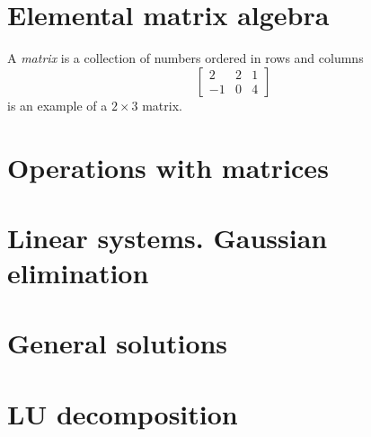 
\section{Elemental matrix algebra}
\begin{defn}[Matrix]
    A \textit{matrix} is a collection of numbers ordered in rows and columns
    \begin{equation}
        \begin{bmatrix} 2 & 2 & 1 \\ -1 & 0 & 4 \end{bmatrix}
    \end{equation}
    is an example of a $2\times 3$ matrix.
\end{defn}

\section{Operations with matrices}

\section{Linear systems. Gaussian elimination}

\section{General solutions}

\section{LU decomposition}
